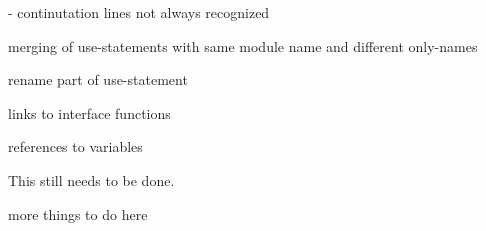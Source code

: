 
\begin{DoxyRefList}
\item[\label{todo__todo000001}%
\hypertarget{todo__todo000001}{}%
global\+Scope$>$ Membre \hyperlink{fortrancode_8cpp_a234e2efe67eececd88b140b46ea37463}{D\+B\+G\+\_\+\+C\+T\+X} (x)]-\/ continutation lines not always recognized
\begin{DoxyItemize}
\item merging of use-\/statements with same module name and different only-\/names
\item rename part of use-\/statement
\item links to interface functions
\item references to variables  
\end{DoxyItemize}
\item[\label{todo__todo000003}%
\hypertarget{todo__todo000003}{}%
Classe \hyperlink{class_todo}{Todo} ]This still needs to be done.  
\item[\label{todo__todo000004}%
\hypertarget{todo__todo000004}{}%
Membre \hyperlink{class_todo_a9e70ec9176ac4c1b20e011b4daddc9d8}{Todo\+:\+:todo} ()]more things to do here 
\end{DoxyRefList}